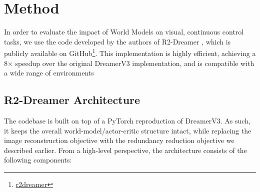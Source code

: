 \documentclass{article}
\begin{document}
\section{Method}

In order to evaluate the impact of World Models on visual, continuous control tasks, we use the code developed by the authors of R2-Dreamer \cite{morihira2026r2dreamer}, which is publicly available on GitHub\footnote{\href{https://github.com/NM512/r2dreamer}{r2dreamer}}. This implementation is highly efficient, achieving a 8$\times$ speedup over the original DreamerV3 implementation, and is compatible with a wide range of environments

\subsection{R2-Dreamer Architecture}

The codebase is built on top of a PyTorch reproduction of DreamerV3. As such, it keeps the overall world-model/actor-critic structure intact, while replacing the image reconstruction objective with the redundancy reduction objective we described earlier. From a high-level perspective, the architecture consists of the following components:
\end{document}
